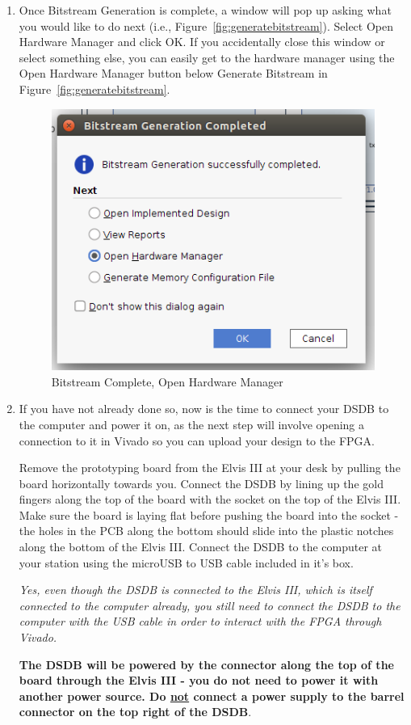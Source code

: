 \documentclass{article}
\begin{document}
\begin{enumerate}
\item Once Bitstream Generation is complete, a window will pop up asking what
you would like to do next (i.e., Figure~\ref{fig:generatebitstream}).  Select Open
Hardware Manager and click OK.  If you accidentally close this window or select
something else, you can easily get to the hardware manager using the Open
Hardware Manager button below Generate Bitstream in
Figure~\ref{fig:generatebitstream}.
\begin{figure}[h!]
	\centering
	\includegraphics[width=0.4\linewidth]{bitstream_complete}
	\caption{Bitstream Complete, Open Hardware Manager}
	\label{fig:bitstreamcomplete}
\end{figure}

\item If you have not already done so, now is the time to connect your DSDB to
the computer and power it on, as the next step will involve opening a connection
to it in Vivado so you can upload your design to the FPGA.

Remove the prototyping board from the Elvis III at your desk by pulling the
board horizontally towards you.  Connect the DSDB by lining up the gold fingers
along the top of the board with the socket on the top of the Elvis III.  Make
sure the board is laying flat before pushing the board into the socket - the
holes in the PCB along the bottom should slide into the plastic notches along
the bottom of the Elvis III.  Connect the DSDB to the computer at your station
using the microUSB to USB cable included in it's box.

\emph{Yes, even though
the DSDB is connected to the Elvis III, which is itself connected to the
computer already, you still need to connect the DSDB to the computer with the
USB cable in order to interact with the FPGA through Vivado.}

\textbf{The DSDB will be powered by the connector along the top of the board
through the Elvis III - you do not need to power it with another power source.
Do \underline{not} connect a power supply to the barrel connector on the top right of the
DSDB}.


\end{enumerate}
\end{document}
